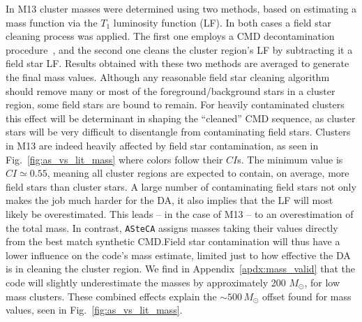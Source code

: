\documentclass[referee]{aa}
\begin{document}
In M13 cluster masses were determined using two methods, based on estimating
a mass function via the $T_1$ luminosity function (LF).
In both cases a field star cleaning process was applied. The first one employs
a CMD decontamination procedure~\citep{Maia_2010}, and the
second one cleans the cluster region's LF by subtracting it a field star LF.\@
Results obtained with these two methods are averaged to generate the final
mass values.
%
Although any reasonable field star cleaning algorithm should remove many or most
of the foreground/background stars in a cluster region, some field stars are
bound to remain. For heavily contaminated clusters this effect will be
determinant in shaping the ``cleaned'' CMD sequence, as cluster stars will be
very difficult to disentangle from contaminating field stars.
%
Clusters in M13 are indeed heavily affected by field star contamination,
as seen in Fig.~\ref{fig:as_vs_lit_mass} where colors follow their $CI$s.
The minimum value is $CI{\simeq}0.55$, meaning all cluster regions are expected
to contain, on average, more field stars than cluster stars.
%
A large number of contaminating field stars not only makes the job much harder
for the DA, it also implies that the LF will most likely be overestimated. This
leads -- in the case of M13 --  to an overestimation of the total mass.
%
In contrast, \texttt{ASteCA} assigns masses taking their values directly from
the best match synthetic CMD.\@ Field star contamination will thus have
a lower influence on the code's mass estimate, limited just to how effective the
DA is in cleaning the cluster region. We find in Appendix~\ref{apdx:mass_valid}
that the code will slightly underestimate the masses by approximately 200
$M_{\odot}$, for low mass clusters.
These combined effects explain the ${\sim}500\,M_{\odot}$ offset found
for mass values, seen in Fig.~\ref{fig:as_vs_lit_mass}.
\end{document}
